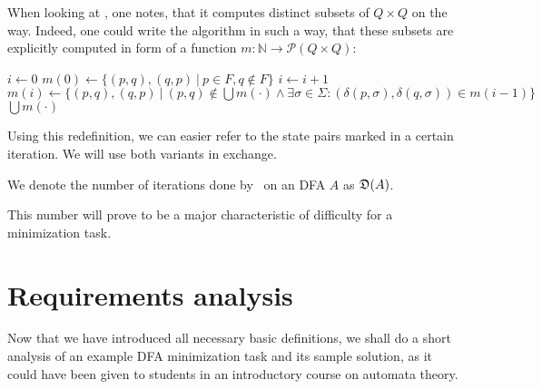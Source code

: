 \noindent When looking at \CompDist, one notes, that it computes distinct subsets of $Q \times Q$ on the way. Indeed, one could write the algorithm in such a way, that these subsets are explicitly computed in form of a function $m\colon\mathbb{N}\to\mathcal{P}(Q\times Q)$:
\vspace{0.2cm}
\begin{algorithmic}[1] \label{ch:2:m-minmark}
	\State $i \gets 0$
	\State $m(0) \gets \{ (p,q), (q,p)\ |\ p \in F, q \notin F \}$
	\Do
		\State $i \gets i + 1$
		\State $m(i) \gets \{ (p,q), (q,p)\ |\ (p,q) \notin \bigcup{m(\cdot)} \land \exists \sigma \in \Sigma \colon (\delta(p,\sigma), \delta(q,\sigma)) \in m(i-1) \}$
	\State \Return $\bigcup{m(\cdot)}$
	\EndFunction
\end{algorithmic}
\vspace{0.2cm}
Using this redefinition, we can easier refer to the state pairs marked in a certain iteration. We will use both variants in exchange.
\begin{definition}\label{ch:2:def:D(A)}
	We denote the number of iterations done by \CompDist\ on an DFA $A$ as $\mathfrak{D}(A)$.
\end{definition}
\noindent This number will prove to be a major characteristic of difficulty for a minimization task.

\section{Requirements analysis}

Now that we have introduced all necessary basic definitions, we shall do a short analysis of an example DFA minimization task and its sample solution, as it could have been given to students in an introductory course on automata theory.

